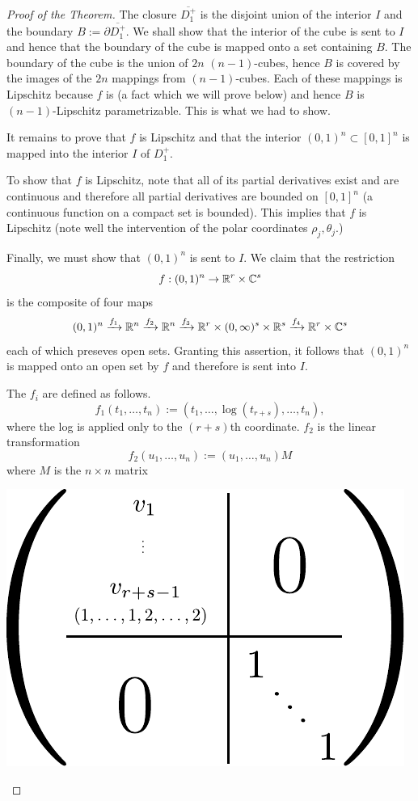 \documentclass[10pt,a4paper,reqno]{amsart}
\begin{document}
\begin{proof}[Proof of the Theorem]
The closure $\overline{D_1^+}$ is the disjoint union of the interior $I$ and
the boundary $B := \partial \overline{D_1^+}$. We shall show that the interior
of the cube is sent to $I$ and hence that the boundary of the cube is mapped
onto a set containing $B$. The boundary of the cube is the union of $2n$
$(n-1)$-cubes, hence $B$ is covered by the images of the $2n$ mappings from
$(n-1)$-cubes. Each of these mappings is Lipschitz because $f$ is (a fact which
we will prove below) and hence $B$ is $(n-1)$-Lipschitz parametrizable. This is
what we had to show.

It remains to prove that $f$ is Lipschitz and that the interior $(0,1)^n
\subset [0,1]^n$ is mapped into the interior $I$ of $D_1^+.$

To show that $f$ is Lipschitz, note that all of its partial derivatives exist
and are continuous and therefore all partial derivatives are bounded on
$[0,1]^n$ (a continuous function on a compact set is bounded). This implies
that $f$ is Lipschitz (note well the intervention of the polar coordinates
$\rho_j, \theta_j.$)

Finally, we must show that $(0,1)^n$ is sent to $I$. We claim that the
restriction \[f: (0,1)^n \rightarrow \mathbb{R}^r\times \mathbb{C}^s\] is the composite of four
maps \[(0,1)^n \xrightarrow{f_1} \mathbb{R}^n \xrightarrow{f_2} \mathbb{R}^n \xrightarrow{f_3}
\mathbb{R}^r\times (0,\infty)^s \times \mathbb{R}^s \xrightarrow{f_4} \mathbb{R}^r\times \mathbb{C}^s\] each
of which preseves open sets. Granting this assertion, it follows that
$(0,1)^n$ is mapped onto an open set by $f$ and therefore is sent into $I$.

The $f_i$ are defined as follows. \[f_1(t_1,\dots,t_n) := (t_1,
\dots,\log(t_{r+s}), \dots,t_n),\] where the log is applied only to the
$(r+s)$th coordinate. $f_2$ is the linear transformation \[f_2(u_1,\dots,u_n)
:= (u_1,\dots,u_n)M \] where $M$ is the $n\times n$ matrix
\begin{center}
    \includegraphics[scale=0.8]{resources/marcus-ch6-mtx}
\end{center}


\end{proof}
\end{document}
